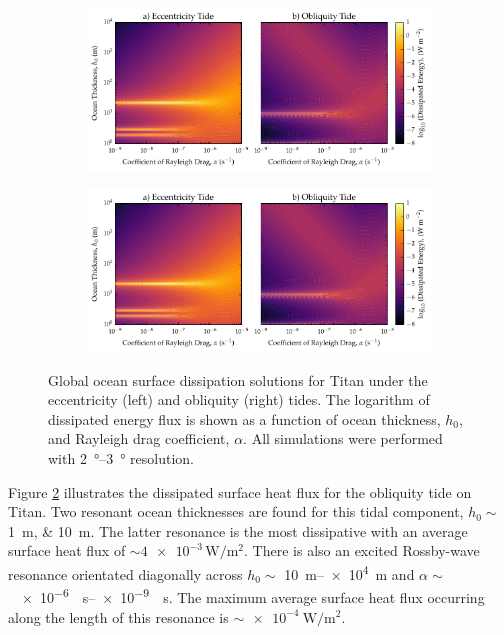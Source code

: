 \begin{figure}[!t]
    \centering
    \begin{subfigure}[t]{0.95\linewidth} %
        \includegraphics[width=\linewidth]{Figures/titan_linear}
        \label{fig:lincEccTitan}
    \end{subfigure}
    \begin{subfigure}[t]{0\linewidth} %
         \includegraphics[width=\linewidth]{Figures/titan_linear}
         \label{fig:linObliqTitan}   
    \end{subfigure}
    \vspace{-0.5cm}
\caption{Global ocean surface dissipation solutions for Titan under the eccentricity (left) and obliquity (right) tides. The logarithm of dissipated energy flux is shown as a function of ocean thickness, $h_0$, and Rayleigh drag coefficient, $\alpha$. All simulations were performed with \SIrange{2}{3}{\degree} resolution.}
\label{fig:linTitan}
\end{figure}

Figure \ref{fig:linObliqTitan} illustrates the dissipated surface heat flux for the obliquity tide on Titan. Two resonant ocean thicknesses are found for this tidal component, $h_0 \sim$ \SIlist{1;10}{\metre}. The latter resonance is the most dissipative with an average surface heat flux of $\sim \num{4e-3}\, \si{\watt\per\square\metre}$. There is also an excited Rossby-wave resonance orientated diagonally across $h_0 \sim$ \SIrange{10}{e4}{\metre} and \hbox{$\alpha \sim$ \SIrange{e-6}{e-9}{\per\second}}. The maximum average surface heat flux occurring along the length of this resonance is $\sim \SI{e-4}{\watt\per\square\metre}$. 

